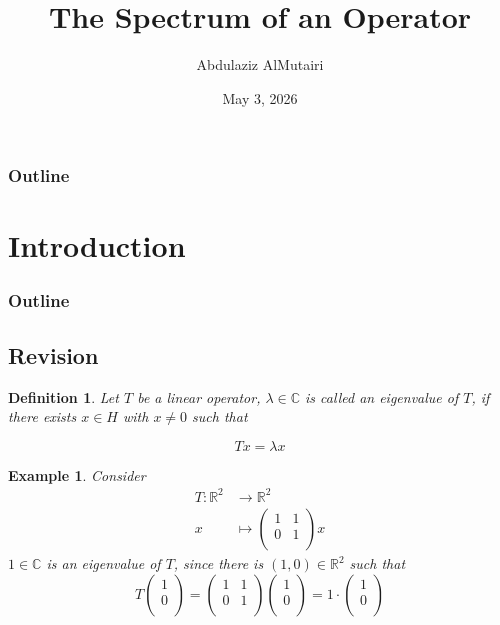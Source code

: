 \documentclass{beamer}
\title{The Spectrum of an Operator}
\author{Abdulaziz AlMutairi}
\date{May 3, 2026}
\newtheorem{defn}{Definition}
\newtheorem{exm}{Example}
\begin{document}
  \begin{frame}
    \maketitle
  \end{frame}

  \begin{frame}
    \frametitle{Outline}
    \tableofcontents[pausesections]
  \end{frame}

  \section{Introduction}
  \begin{frame}
    \frametitle{Outline}
    \tableofcontents[current]
  \end{frame}

  \subsection{Revision}
  \begin{frame}{\subsecname}
    \begin{defn}
    Let $T$ be a linear operator, $\lambda \in \mathbb{C}$ is called an eigenvalue of $T$, if there exists $x \in H$ with $x\not=0$ such that

    $$
    Tx=\lambda x
    $$
    \end{defn}
  \end{frame}

  \begin{frame}{\subsecname}
    \begin{exm}
      Consider
      $$
      \begin{aligned}
        T:\mathbb{R}^{2}&\longrightarrow\mathbb{R}^{2} \\
        x&\longmapsto\begin{pmatrix}1&1\\0&1\\\end{pmatrix}x
      \end{aligned}
      $$
      $1\in\mathbb{C}$ is an eigenvalue of $T$, since there is $(1,0)\in\mathbb{R}^{2}$ such that
      $$
      T\begin{pmatrix}1\\0\\\end{pmatrix} = \begin{pmatrix}1&1\\0&1\\\end{pmatrix}\begin{pmatrix}1\\0\\\end{pmatrix} = 1\cdot\begin{pmatrix}1\\0\\\end{pmatrix}
      $$
    \end{exm}
  \end{frame}
\end{document}
